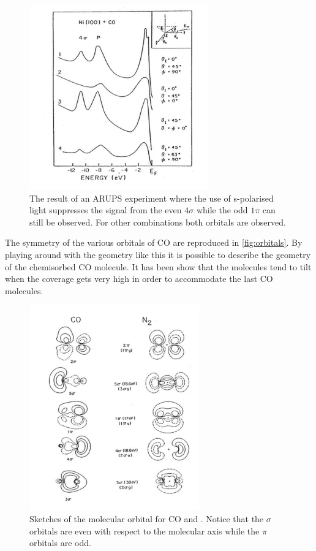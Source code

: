 \begin{figure}[h!]
	\begin{center}
	\includegraphics[scale=4.5]{figures/05_08.png}
	\caption{The result of an ARUPS experiment where the use of s-polarised light suppresses the signal from the even $4\sigma$ while the odd $1\pi$ can still be observed. For other combinations both orbitals are observed.}
	\label{fig:arupsspol}
	\end{center}
\end{figure}

The symmetry of the various orbitals of CO are reproduced in \autoref{fig:orbitals}. By playing around with the geometry like this it is possible to describe the geometry of the chemisorbed CO molecule. It has been show that the molecules tend to tilt when the coverage gets very high in order to accommodate the last CO molecules.

\begin{figure}[h!]
	\begin{center}
	\includegraphics[scale=4.5]{figures/05_09.png}
	\caption{Sketches of the molecular orbital for CO and . Notice that the $\sigma$ orbitals are even with respect to the molecular axis while the $\pi$ orbitals are odd.}
	\label{fig:orbitals}
	\end{center}
\end{figure}

